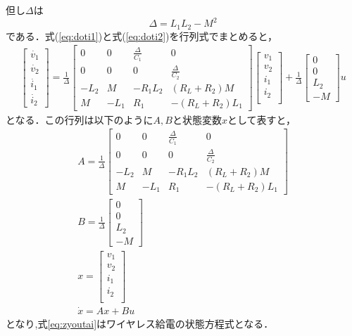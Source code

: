 \documentclass[12pt]{jarticle}
\begin{document}
$但し\Delta は$
\begin{equation}
\Delta=L_1L_2-M^2\nonumber
\end{equation}
である．式(\ref{eq:doti1})と式(\ref{eq:doti2})を行列式でまとめると，
\begin{eqnarray}
\begin{bmatrix}
\dot{v_1}\\
\dot{v_2}\\
\dot{i_1}\\
\dot{i_2}
\end{bmatrix}
=\frac{1}{\Delta}
\begin{bmatrix}
0 & 0 & \frac{\Delta}{C_1} & 0 \\
0 & 0 & 0 & \frac{\Delta}{C_2} \\
-L_2 & M & -R_1L_2 & (R_L+R_2)M \\
M & -L_1 & R_1 & -(R_L+R_2)L_1
\end{bmatrix}
\begin{bmatrix}
v_1\\
v_2\\
i_1\\
i_2\\
\end{bmatrix}
+\frac{1}{\Delta}
\begin{bmatrix}
0\\
0\\
L_2\\
-M
\end{bmatrix}
u
\label{eq:tankei_joutai}
\end{eqnarray}
となる．この行列は以下のように$A,Bと状態変数x$として表すと，
\begin{gather}
A=\frac{1}{\Delta}
\begin{bmatrix}
0 & 0 & \frac{\Delta}{C_1} & 0 \\
0 & 0 & 0 & \frac{\Delta}{C_2} \\
-L_2 & M & -R_1L_2 & (R_L+R_2)M \\
M & -L_1 & R_1 & -(R_L+R_2)L_1
\end{bmatrix}\\
B=\frac{1}{\Delta}
\begin{bmatrix}
0\\
0\\
L_2\\
-M
\end{bmatrix}\\
x=
\begin{bmatrix}
v_1\\
v_2\\
i_1\\
i_2\\
\end{bmatrix}\\
\label{eq:zyoutai}
\dot{x}=Ax+Bu
\end{gather}
となり,式\ref{eq:zyoutai}はワイヤレス給電の状態方程式となる．
\end{document}
